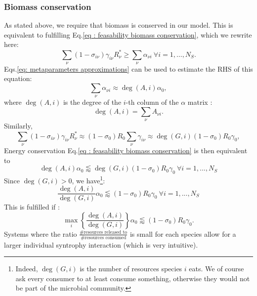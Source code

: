 \documentclass[12pt, titlepage]{report}
\begin{document}
\subsubsection{Biomass conservation}
As stated above, we require that biomass is conserved in our model. This is equivalent to fulfilling Eq.\eqref{eq : feasability biomass conservation}, which we rewrite here:
\begin{equation}
\sum_\nu \left(1-\sigma_{i\nu}\right)\gamma_{i\nu}R^*_\nu \geq \sum_\nu \alpha_{\nu i} \ \forall i=1,\dots, N_S.
\end{equation}
Eqs.\eqref{eq: metaparameters approximations} can be used to estimate the RHS of this equation:
\begin{equation}
\sum_\nu \alpha_{\nu i} \approx \deg(A, i) \alpha_0,
\end{equation}
where $\deg(A,i)$ is the degree of the $i$-th column of the $\alpha$ matrix :
\begin{equation}
\deg(A, i) = \sum_\nu A_{\nu i}.
\end{equation}
Similarly,
\begin{equation}
\sum_\nu \left(1-\sigma_{i\nu}\right)\gamma_{i\nu} R^*_\nu \approx (1-\sigma_0)R_0\sum_{\nu}\gamma_{i\nu} \approx \deg(G, i)(1-\sigma_0)R_0\gamma_0,
\end{equation}
Energy conservation Eq.\eqref{eq : feasability biomass conservation} is then equivalent to
\begin{equation}
\deg(A,i) \alpha_0 \lessapprox \deg(G,i) (1-\sigma_0)R_0\gamma_0 \ \forall i=1,...,N_S
\end{equation}
Since $\deg(G,i) > 0 $, we have\footnote{Indeed, $\deg(G,i)$ is the number of resources species $i$ eats. We of course ask every consumer to at least consume something, otherwise they would not be part of the microbial community.}:
\begin{equation}
\frac{\deg(A,i)}{\deg(G,i)} \alpha_0 \lessapprox (1-\sigma_0)R_0\gamma_0 \ \forall i=1,...,N_S
\end{equation}
This is fulfilled if :
\begin{equation}\label{eq: feasability energy conservation}
\boxed{
\max_i\left\{\frac{\deg(A,i)}{\deg(G,i)}\right\} \alpha_0 \lessapprox (1-\sigma_0)R_0 \gamma_0
}.
\end{equation}
  Systems where the ratio $\frac{\# \text{resources released to}}{\# \text{resources consumed}}$ is small for each species allow for a larger individual syntrophy interaction (which is very intuitive).
\end{document}
